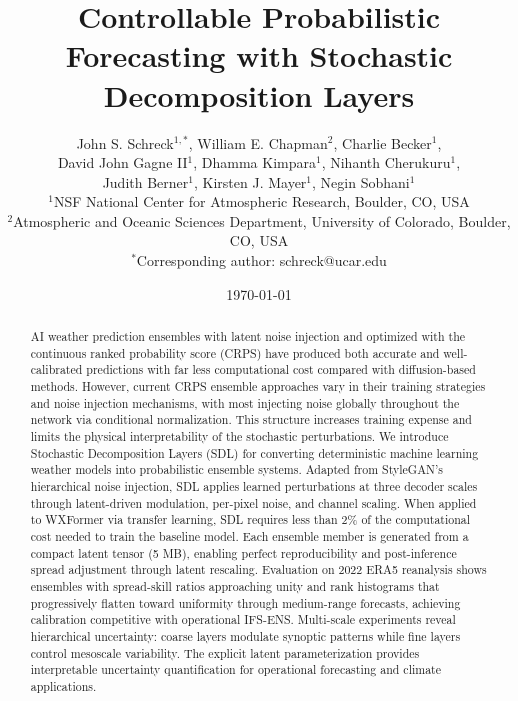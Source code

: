 \documentclass[11pt]{article}
\begin{document}
\title{Controllable Probabilistic Forecasting with Stochastic Decomposition Layers}

\author{
John S. Schreck$^{1,*}$, 
William E. Chapman$^{2}$, 
Charlie Becker$^{1}$, \\
David John Gagne II$^{1}$, 
Dhamma Kimpara$^{1}$, 
Nihanth Cherukuru$^{1}$, \\
Judith Berner$^{1}$, 
Kirsten J. Mayer$^{1}$, 
Negin Sobhani$^{1}$ \\[0.3cm]
\small $^{1}$NSF National Center for Atmospheric Research, Boulder, CO, USA \\
\small $^{2}$Atmospheric and Oceanic Sciences Department, University of Colorado, Boulder, CO, USA \\
\small $^{*}$Corresponding author: schreck@ucar.edu
}

\date{\today}

\maketitle

\begin{abstract}
AI weather prediction ensembles with latent noise injection and optimized with the continuous ranked probability score (CRPS) have produced both accurate and well-calibrated predictions with far less computational cost compared with diffusion-based methods. However, current CRPS ensemble approaches vary in their training strategies and noise injection mechanisms, with most injecting noise globally throughout the network via conditional normalization. This structure increases training expense and limits the physical interpretability of the stochastic perturbations. We introduce Stochastic Decomposition Layers (SDL) for converting deterministic machine learning weather models into probabilistic ensemble systems. Adapted from StyleGAN's hierarchical noise injection, SDL applies learned perturbations at three decoder scales through latent-driven modulation, per-pixel noise, and channel scaling. When applied to WXFormer via transfer learning, SDL requires less than 2\% of the computational cost needed to train the baseline model. Each ensemble member is generated from a compact latent tensor (5 MB), enabling perfect reproducibility and post-inference spread adjustment through latent rescaling. Evaluation on 2022 ERA5 reanalysis shows ensembles with spread-skill ratios approaching unity and rank histograms that progressively flatten toward uniformity through medium-range forecasts, achieving calibration competitive with operational IFS-ENS. Multi-scale experiments reveal hierarchical uncertainty: coarse layers modulate synoptic patterns while fine layers control mesoscale variability. The explicit latent parameterization provides interpretable uncertainty quantification for operational forecasting and climate applications.
\end{abstract}
\end{document}
